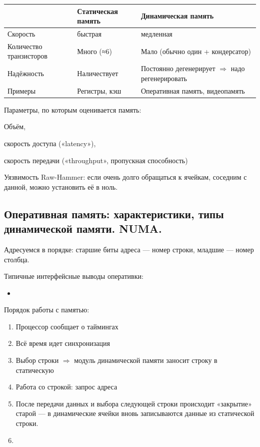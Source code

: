 \documentclass[12pt, a4paper]{article}
\begin{document}
\begin{center}
    \begin{tabular}{|| m{10em} | m{10em} | m{12em} ||} 
     \hline
     &                          \textbf{Статическая память}  & \textbf{Динамическая память} \\ [0.5ex] 
     \hline\hline
     Скорость &                 быстрая             & медленная \\ 
     \hline 
     Количество транзисторов &  Много (≈6)          & Мало (обычно один + кондерсатор) \\ 
     \hline
     Надёжность &  Наличествует          & Постоянно дегенерирует $\Rightarrow$ надо регенерировать  \\
     \hline
     Примеры &  Регистры, кэш          & Оперативная память, видеопамять  \\
     \hline
    \end{tabular}
\end{center}

Параметры, по которым оценивается память:
\begin{center}
    Объём, 
    
    скорость доступа («latency»), 
    
    скорость передачи («throughput», пропускная способность)
\end{center}

Уязвимость Raw-Hammer: если очень долго обращаться к ячейкам, соседним с данной, можно установить её в ноль.




\subsection{Оперативная память: характеристики, типы динамической памяти. NUMA.}

Адресуемся в порядке: старшие биты адреса — номер строки, младшие — номер столбца.

Типичные интерфейсные выводы оперативки:

\begin{itemize}
    \item 
\end{itemize}

Порядок работы с памятью: 
\begin{enumerate}
    \item Процессор сообщает о таймингах
    \item Всё время идет синхронизация 
    \item Выбор строки $\Rightarrow$ модуль динамической памяти заносит строку в статическую
    \item Работа со строкой: запрос адреса
    \item После передачи данных и выбора следующей строки происходит «закрытие» старой 
    — в динамические ячейки вновь записываются данные из статической строки.
    \item 
\end{enumerate}
\end{document}
